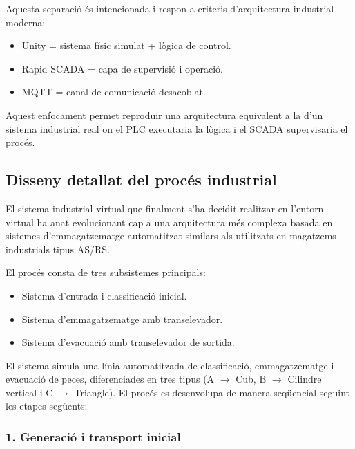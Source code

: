 \documentclass[a4paper,11pt,DIV=13,headings=normal,abstract=true,twoside=semi]{article}
\begin{document}
Aquesta separació és intencionada i respon a criteris d'arquitectura industrial moderna:

\begin{itemize}
\item Unity = sistema físic simulat + lògica de control.
\item Rapid SCADA = capa de supervisió i operació.
\item MQTT = canal de comunicació desacoblat.
\end{itemize}

Aquest enfocament permet reproduir una arquitectura equivalent a la d'un sistema industrial real on el PLC executaria la lògica i el SCADA supervisaria el procés.

\subsection{Disseny detallat del procés industrial}
El sistema industrial virtual que finalment s'ha decidit realitzar en l'entorn virtual ha anat evolucionant cap a una arquitectura més complexa basada en sistemes d'emmagatzematge automatitzat similars als utilitzats en magatzems industrials tipus AS/RS.

El procés consta de tres subsistemes principals:

\begin{itemize}
\item Sistema d'entrada i classificació inicial.
\item Sistema d'emmagatzematge amb transelevador.
\item Sistema d'evacuació amb transelevador de sortida.
\end{itemize}



El sistema simula una línia automatitzada de classificació, emmagatzematge i evacuació de peces, diferenciades en tres tipus (A $\rightarrow$ Cub, B $\rightarrow$ Cilindre vertical i C $\rightarrow$ Triangle). El procés es desenvolupa de manera seqüencial seguint les etapes següents:

\subsubsection*{1. Generació i transport inicial}
\end{document}
